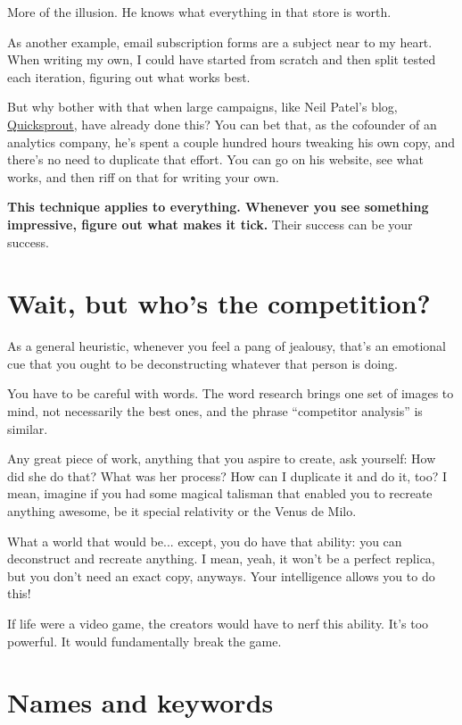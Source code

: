More of the illusion. He knows what everything in that store is worth.

As another example, email subscription forms are a subject near to my
heart. When writing my own, I could have started from scratch and then split
tested each iteration, figuring out what works best.

But why bother with that when large campaigns, like Neil Patel's blog, \href{http://www.quicksprout.com/blog/}{Quicksprout}, have already done this? You can bet that, as the cofounder of an analytics company, he's spent a
couple hundred hours tweaking his own copy, and there's no need to duplicate
that effort. You can go on his website, see what works, and then riff on that
for writing your own.

\textbf{This technique applies to everything. Whenever you see something impressive,
  figure out what makes it tick.} Their success can be your success.

\section{Wait, but who's the competition?}

As a general heuristic, whenever you feel a pang of jealousy, that's an emotional cue that
you ought to be deconstructing whatever that person is doing.

You have to be careful with words. The word research brings one set of images to
mind, not necessarily the best ones, and the phrase ``competitor analysis'' is
similar.

Any great piece of work, anything that you aspire to create, ask yourself: How
did she do that? What was her process? How can I duplicate it and do it, too? I
mean, imagine if you had some magical talisman that enabled you to recreate
anything awesome, be it special relativity or the Venus de Milo.

What a world that would be... except, you do have that ability: you can deconstruct and recreate anything. I mean, yeah, it won't be a perfect replica, but you don't
need an exact copy, anyways. Your intelligence allows you to do this!

If life were a video game, the creators would have to nerf this ability. It's
too powerful. It would fundamentally break the game. 

\section{Names and keywords}

